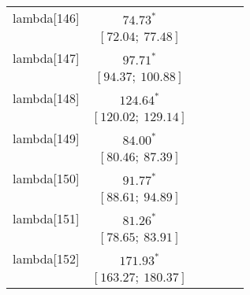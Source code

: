 \begin{table}
\begin{center}
\begin{tabular}{l c c c c c }
lambda[146] & $74.73^{*}$                      &                           &                           &                         &                         \\
            & $[72.04;\ 77.48]$                &                           &                           &                         &                         \\
lambda[147] & $97.71^{*}$                      &                           &                           &                         &                         \\
            & $[94.37;\ 100.88]$               &                           &                           &                         &                         \\
lambda[148] & $124.64^{*}$                     &                           &                           &                         &                         \\
            & $[120.02;\ 129.14]$              &                           &                           &                         &                         \\
lambda[149] & $84.00^{*}$                      &                           &                           &                         &                         \\
            & $[80.46;\ 87.39]$                &                           &                           &                         &                         \\
lambda[150] & $91.77^{*}$                      &                           &                           &                         &                         \\
            & $[88.61;\ 94.89]$                &                           &                           &                         &                         \\
lambda[151] & $81.26^{*}$                      &                           &                           &                         &                         \\
            & $[78.65;\ 83.91]$                &                           &                           &                         &                         \\
lambda[152] & $171.93^{*}$                     &                           &                           &                         &                         \\
            & $[163.27;\ 180.37]$              &                           &                           &                         &                         \\

\end{tabular}
\end{center}
\end{table}
